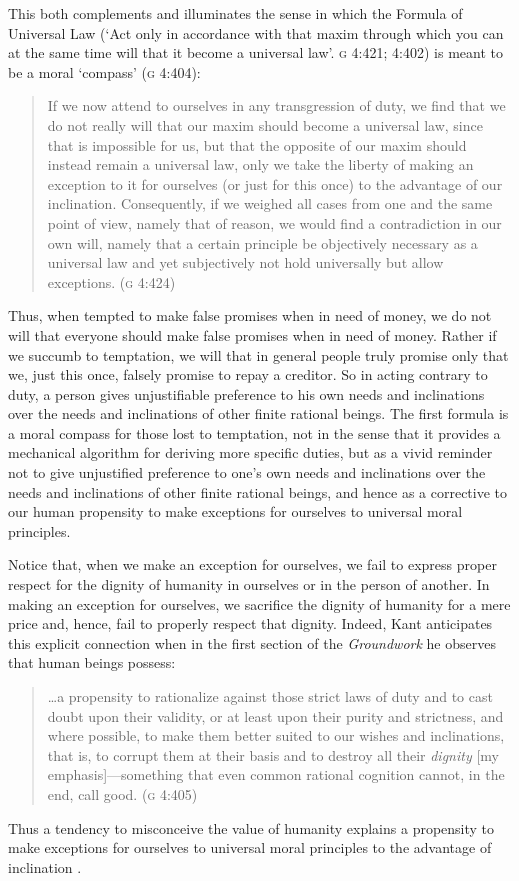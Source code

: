 \documentclass[a4paper,12pt]{article}
\begin{document}
This both complements and illuminates the sense in which the Formula of Universal Law (`Act only in accordance with that maxim through which you can at the same time will that it become a universal law'. \textsc{g} 4:421; 4:402) is meant to be a moral `compass' (\textsc{g} 4:404): 
\begin{quote}
	If we now attend to ourselves in any transgression of duty, we find that we do not really will that our maxim should become a universal law, since that is impossible for us, but that the opposite of our maxim should instead remain a universal law, only we take the liberty of making an exception to it for ourselves (or just for this once) to the advantage of our inclination. Consequently, if we weighed all cases from one and the same point of view, namely that of reason, we would find a contradiction in our own will, namely that a certain principle be objectively necessary as a universal law and yet subjectively not hold universally but allow exceptions. (\textsc{g} 4:424) 
\end{quote}
Thus, when tempted to make false promises when in need of money, we do not will that everyone should make false promises when in need of money. Rather if we succumb to temptation, we will that in general people truly promise only that we, just this once, falsely promise to repay a creditor. So in acting contrary to duty, a person gives unjustifiable preference to his own needs and inclinations over the needs and inclinations of other finite rational beings. The first formula is a moral compass for those lost to temptation, not in the sense that it provides a mechanical algorithm for deriving more specific duties, but as a vivid reminder not to give unjustified preference to one's own needs and inclinations over the needs and inclinations of other finite rational beings, and hence as a corrective to our human propensity to make exceptions for ourselves to universal moral principles. 

Notice that, when we make an exception for ourselves, we fail to express proper respect for the dignity of humanity in ourselves or in the person of another. In making an exception for ourselves, we sacrifice the dignity of humanity for a mere price and, hence, fail to properly respect that dignity. Indeed, Kant anticipates this explicit connection when in the first section of the \emph{Groundwork} he observes that human beings possess: 
\begin{quote}
	\ldots a propensity to rationalize against those strict laws of duty and to cast doubt upon their validity, or at least upon their purity and strictness, and where possible, to make them better suited to our wishes and inclinations, that is, to corrupt them at their basis and to destroy all their \emph{dignity} [my emphasis]---something that even common rational cognition cannot, in the end, call good. (\textsc{g} 4:405) 
\end{quote}
Thus a tendency to misconceive the value of humanity explains a propensity to make exceptions for ourselves to universal moral principles to the advantage of inclination \citep[for a similar account of the role of dignity in explaining the injunction to never treat a person merely as a means see][]{Thomas-Hill:1992nr}. 
\end{document}
